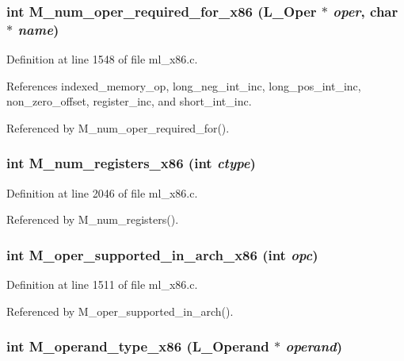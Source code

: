 \subsubsection{\setlength{\rightskip}{0pt plus 5cm}int M\_\-num\_\-oper\_\-required\_\-for\_\-x86 (L\_\-Oper $\ast$ {\em oper}, char $\ast$ {\em name})}\label{m__x86_8h_750d107a95607390f070d2ad36039bb1}




Definition at line 1548 of file ml\_\-x86.c.

References indexed\_\-memory\_\-op, long\_\-neg\_\-int\_\-inc, long\_\-pos\_\-int\_\-inc, non\_\-zero\_\-offset, register\_\-inc, and short\_\-int\_\-inc.

Referenced by M\_\-num\_\-oper\_\-required\_\-for().
\subsubsection{\setlength{\rightskip}{0pt plus 5cm}int M\_\-num\_\-registers\_\-x86 (int {\em ctype})}\label{m__x86_8h_87cb8eb46758138b05912f0a8cf8d671}




Definition at line 2046 of file ml\_\-x86.c.

Referenced by M\_\-num\_\-registers().
\subsubsection{\setlength{\rightskip}{0pt plus 5cm}int M\_\-oper\_\-supported\_\-in\_\-arch\_\-x86 (int {\em opc})}\label{m__x86_8h_4fdc9b50549bb601d2ba3e96a20cdc6a}




Definition at line 1511 of file ml\_\-x86.c.

Referenced by M\_\-oper\_\-supported\_\-in\_\-arch().
\subsubsection{\setlength{\rightskip}{0pt plus 5cm}int M\_\-operand\_\-type\_\-x86 (L\_\-Operand $\ast$ {\em operand})}\label{m__x86_8h_a9876dd91246fda74bd1d64d44d42b91}





